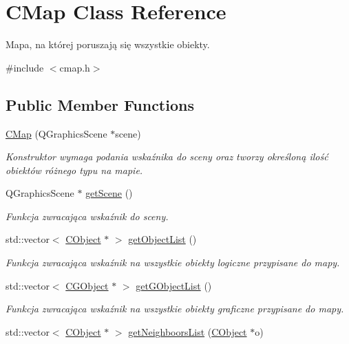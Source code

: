 \hypertarget{class_c_map}{}\section{C\+Map Class Reference}
\label{class_c_map}


Mapa, na której poruszają się wszystkie obiekty.  




{\ttfamily \#include $<$cmap.\+h$>$}

\subsection*{Public Member Functions}
\begin{DoxyCompactItemize}
\item 
\mbox{\hyperlink{class_c_map_a23632998cdecdd0b9c77c799e5d5d51b}{C\+Map}} (Q\+Graphics\+Scene $\ast$scene)
\begin{DoxyCompactList}\small\item\em Konstruktor wymaga podania wskaźnika do sceny oraz tworzy określoną ilość obiektów różnego typu na mapie. \end{DoxyCompactList}\item 
Q\+Graphics\+Scene $\ast$ \mbox{\hyperlink{class_c_map_ac2282caabd7d3830bd1c731177883e50}{get\+Scene}} ()
\begin{DoxyCompactList}\small\item\em Funkcja zwracająca wskaźnik do sceny. \end{DoxyCompactList}\item 
std\+::vector$<$ \mbox{\hyperlink{class_c_object}{C\+Object}} $\ast$ $>$ \mbox{\hyperlink{class_c_map_ae6b5f2e5ca9db035092b730ad92a4aaf}{get\+Object\+List}} ()
\begin{DoxyCompactList}\small\item\em Funkcja zwracająca wskaźnik na wszystkie obiekty logiczne przypisane do mapy. \end{DoxyCompactList}\item 
std\+::vector$<$ \mbox{\hyperlink{class_c_g_object}{C\+G\+Object}} $\ast$ $>$ \mbox{\hyperlink{class_c_map_ab37b3b5bf85c57a891ed2fd591a01ea9}{get\+G\+Object\+List}} ()
\begin{DoxyCompactList}\small\item\em Funkcja zwracająca wskaźnik na wszystkie obiekty graficzne przypisane do mapy. \end{DoxyCompactList}\item 
std\+::vector$<$ \mbox{\hyperlink{class_c_object}{C\+Object}} $\ast$ $>$ \mbox{\hyperlink{class_c_map_aee9422cd38e050f52fb42bf2e7f4e8ed}{get\+Neighboors\+List}} (\mbox{\hyperlink{class_c_object}{C\+Object}} $\ast$o)

\end{DoxyCompactItemize}
